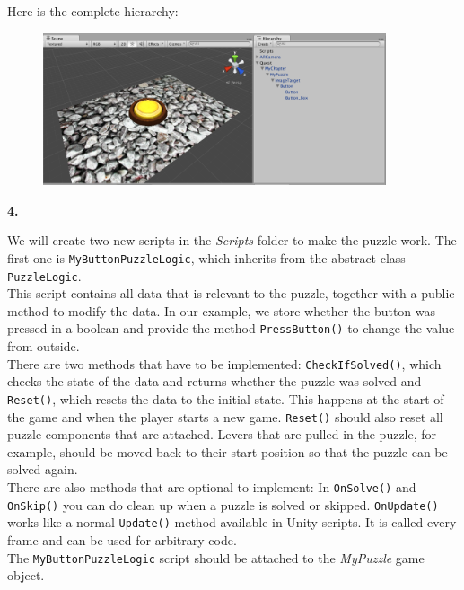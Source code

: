 \documentclass[a4paper]{article}
\begin{document}
Here is the complete hierarchy:

\begin{figure}[H]
\centering
\includegraphics[width=0.9\textwidth]{figures/3-3.png}
\end{figure}

\textbf{4.} 

We will create two new scripts in the \textit{Scripts} folder to make the puzzle work. The first one is \texttt{MyButtonPuzzleLogic}, which inherits from the abstract class \texttt{PuzzleLogic}.\\

This script contains all data that is relevant to the puzzle, together with a public method to modify the data. In our example, we store whether the button was pressed in a boolean and provide the method \texttt{PressButton()} to change the value from outside.\\

There are two methods that have to be implemented: \texttt{CheckIfSolved()}, which checks the state of the data and returns whether the puzzle was solved and \texttt{Reset()}, which resets the data to the initial state. This happens at the start of the game and when the player starts a new game. \texttt{Reset()} should also reset all puzzle components that are attached. Levers that are pulled in the puzzle, for example, should be moved back to their start position so that the puzzle can be solved again.\\

There are also methods that are optional to implement: In \texttt{OnSolve()} and \texttt{OnSkip()} you can do clean up when a puzzle is solved or skipped. \texttt{OnUpdate()} works like a normal \texttt{Update()} method available in Unity scripts. It is called every frame and can be used for arbitrary code.\\



The \texttt{MyButtonPuzzleLogic} script should be attached to the \textit{MyPuzzle} game object.\\
\end{document}
